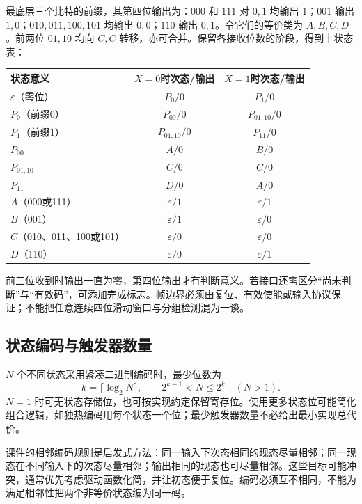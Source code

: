 \documentclass[UTF8,fontset=none,zihao=-4,a4paper]{ctexart}
\begin{document}
最底层三个比特的前缀，其第四位输出为：$000$ 和 $111$ 对 $0,1$ 均输出 $1$；$001$ 输出 $1,0$；$010,011,100,101$ 均输出 $0,0$；$110$ 输出 $0,1$。令它们的等价类为 $A,B,C,D$。前两位 $01,10$ 均向 $C,C$ 转移，亦可合并。保留各接收位数的阶段，得到十状态表：
\begin{center}
\begin{tabular}{l cc}
\toprule 状态意义&$X=0$时次态/输出&$X=1$时次态/输出\\\midrule
$\varepsilon$（零位）&$P_0/0$&$P_1/0$\\
$P_0$（前缀0）&$P_{00}/0$&$P_{01,10}/0$\\
$P_1$（前缀1）&$P_{01,10}/0$&$P_{11}/0$\\
$P_{00}$&$A/0$&$B/0$\\
$P_{01,10}$&$C/0$&$C/0$\\
$P_{11}$&$D/0$&$A/0$\\
$A$（000或111）&$\varepsilon/1$&$\varepsilon/1$\\
$B$（001）&$\varepsilon/1$&$\varepsilon/0$\\
$C$（010、011、100或101）&$\varepsilon/0$&$\varepsilon/0$\\
$D$（110）&$\varepsilon/0$&$\varepsilon/1$\\\bottomrule
\end{tabular}
\end{center}
前三位收到时输出一直为零，第四位输出才有判断意义。若接口还需区分“尚未判断”与“有效码”，可添加完成标志。帧边界必须由复位、有效使能或输入协议保证；不能把任意连续四位滑动窗口与分组检测混为一谈。

\subsection{状态编码与触发器数量}
$N$ 个不同状态采用紧凑二进制编码时，最少位数为
\[
k=\lceil\log_2N\rceil,\qquad 2^{k-1}<N\le2^k\quad(N>1).
\]
$N=1$ 时可无状态存储位，也可按实现约定保留寄存位。使用更多状态位可能简化组合逻辑，如独热编码用每个状态一个位；最少触发器数量不必给出最小实现总代价。

课件的相邻编码规则是启发式方法：同一输入下次态相同的现态尽量相邻；同一现态在不同输入下的次态尽量相邻；输出相同的现态也可尽量相邻。这些目标可能冲突，通常优先考虑驱动函数化简，并让初态便于复位。编码必须互不相同，不能为满足相邻性把两个非等价状态编为同一码。
\end{document}
